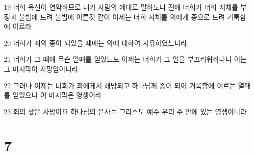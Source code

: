 \par 19 너희 육신이 연약하므로 내가 사람의 예대로 말하노니 전에 너희가 너희 지체를 부정과 불법에 드려 불법에 이른것 같이 이제는 너희 지체를 의에게 종으로 드려 거룩함에 이르라
\par 20 너희가 죄의 종이 되었을 때에는 의에 대하여 자유하였느니라
\par 21 너희가 그 때에 무슨 열매를 얻었느뇨 이제는 너희가 그 일을 부끄러워하나니 이는 그 마지막이 사망임이니라
\par 22 그러나 이제는 너희가 죄에게서 해방되고 하나님께 종이 되어 거룩함에 이르는 열매를 얻었으니 이 마지막은 영생이라
\par 23 죄의 삯은 사망이요 하나님의 은사는 그리스도 예수 우리 주 안에 있는 영생이니라

\chapter{7}

